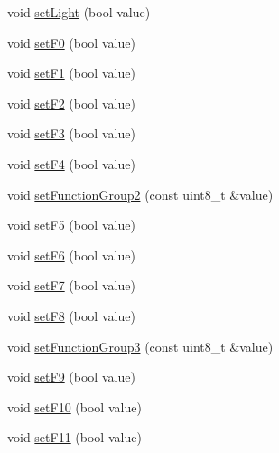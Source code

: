 \begin{DoxyCompactItemize}
\item 
void \hyperlink{classTBT_1_1LocDecoder_a71807a8bab2731cc511659f118ecb01a_a71807a8bab2731cc511659f118ecb01a}{set\+Light} (bool value)
\item 
void \hyperlink{classTBT_1_1LocDecoder_ae7dc2a2221ba08ecaf34f50636f59b54_ae7dc2a2221ba08ecaf34f50636f59b54}{set\+F0} (bool value)
\item 
void \hyperlink{classTBT_1_1LocDecoder_aba76c6a9b002224297ba04ded570eee4_aba76c6a9b002224297ba04ded570eee4}{set\+F1} (bool value)
\item 
void \hyperlink{classTBT_1_1LocDecoder_a60e4822d5d730abec02cf045353d5316_a60e4822d5d730abec02cf045353d5316}{set\+F2} (bool value)
\item 
void \hyperlink{classTBT_1_1LocDecoder_a6316b9510a9f3552dae834bb6c3deebc_a6316b9510a9f3552dae834bb6c3deebc}{set\+F3} (bool value)
\item 
void \hyperlink{classTBT_1_1LocDecoder_ae37228489df216238a51e1a22c37d66c_ae37228489df216238a51e1a22c37d66c}{set\+F4} (bool value)
\item 
void \hyperlink{classTBT_1_1LocDecoder_af021433df427aac432590da7be6393a8_af021433df427aac432590da7be6393a8}{set\+Function\+Group2} (const uint8\+\_\+t \&value)
\item 
void \hyperlink{classTBT_1_1LocDecoder_a4e548e580a6ec3c93369af591281e00f_a4e548e580a6ec3c93369af591281e00f}{set\+F5} (bool value)
\item 
void \hyperlink{classTBT_1_1LocDecoder_af971c14a9437b240d17ab4ca9ffb3e67_af971c14a9437b240d17ab4ca9ffb3e67}{set\+F6} (bool value)
\item 
void \hyperlink{classTBT_1_1LocDecoder_a16a3659cd9a64be4b6ef43b499004434_a16a3659cd9a64be4b6ef43b499004434}{set\+F7} (bool value)
\item 
void \hyperlink{classTBT_1_1LocDecoder_a6a65d02e101d91142ce48587c9c905cf_a6a65d02e101d91142ce48587c9c905cf}{set\+F8} (bool value)
\item 
void \hyperlink{classTBT_1_1LocDecoder_a81f9805d0a984a94dab529602ef9ae64_a81f9805d0a984a94dab529602ef9ae64}{set\+Function\+Group3} (const uint8\+\_\+t \&value)
\item 
void \hyperlink{classTBT_1_1LocDecoder_a725b9d78cbdbd1e60a9102ddf5b8aaf3_a725b9d78cbdbd1e60a9102ddf5b8aaf3}{set\+F9} (bool value)
\item 
void \hyperlink{classTBT_1_1LocDecoder_a9976487964f6167d2d5e084d4ed787b7_a9976487964f6167d2d5e084d4ed787b7}{set\+F10} (bool value)
\item 
void \hyperlink{classTBT_1_1LocDecoder_aa732b54dfa7d535cec4aaab105f4c64d_aa732b54dfa7d535cec4aaab105f4c64d}{set\+F11} (bool value)

\end{DoxyCompactItemize}
